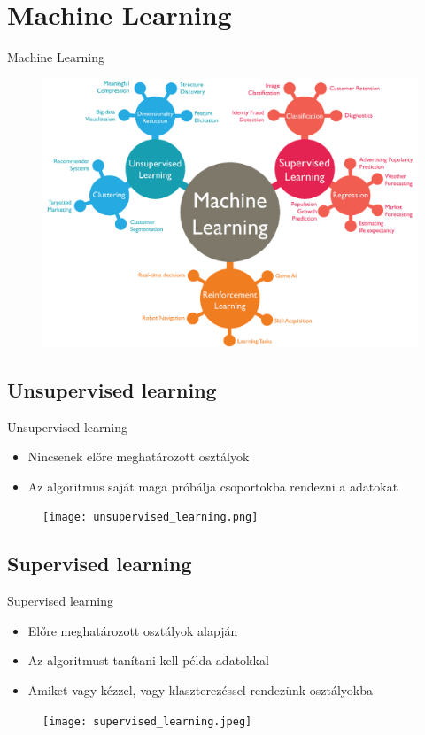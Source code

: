 \documentclass{beamer}
\begin{document}
\section{Machine Learning}
\begin{frame}{Machine Learning}
    \centering
    \begin{figure}
        \includegraphics[scale=0.2]{machine_learning.png}    
    \end{figure}
\end{frame}
\subsection{Unsupervised learning}
\begin{frame}{Unsupervised learning}
    \begin{itemize}
        \item Nincsenek előre meghatározott osztályok
        \item Az algoritmus saját maga próbálja csoportokba rendezni a adatokat
    \end{itemize}
    \begin{figure}
        \texttt{[image: unsupervised\_learning.png]}
    \end{figure}
\end{frame}
\subsection{Supervised learning}
\begin{frame}{Supervised learning}
    \begin{itemize}
        \item Előre meghatározott osztályok alapján
        \item Az algoritmust tanítani kell példa adatokkal 
        \item Amiket vagy kézzel, vagy klaszterezéssel rendezünk osztályokba
    \end{itemize}
    \begin{figure}
        \texttt{[image: supervised\_learning.jpeg]}
    \end{figure}
\end{frame}
\end{document}
